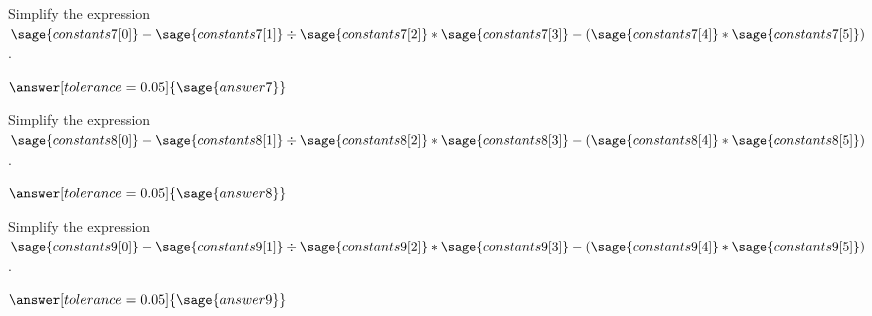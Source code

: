 \documentclass{ximera}
\begin{document}
\begin{question}
Simplify the expression $\sage{constants7[0]} - \sage{constants7[1]} \div \sage{constants7[2]} * \sage{constants7[3]} - (\sage{constants7[4]} * \sage{constants7[5]})$. 

$\answer[tolerance=0.05]{\sage{answer7}}$
\end{question}

\begin{question}
	Simplify the expression $\sage{constants8[0]} - \sage{constants8[1]} \div \sage{constants8[2]} * \sage{constants8[3]} - (\sage{constants8[4]} * \sage{constants8[5]})$. 
	
	$\answer[tolerance=0.05]{\sage{answer8}}$
\end{question}

\begin{question}
	Simplify the expression $\sage{constants9[0]} - \sage{constants9[1]} \div \sage{constants9[2]} * \sage{constants9[3]} - (\sage{constants9[4]} * \sage{constants9[5]})$.
	
	$\answer[tolerance=0.05]{\sage{answer9}}$
\end{question}
\end{document}
